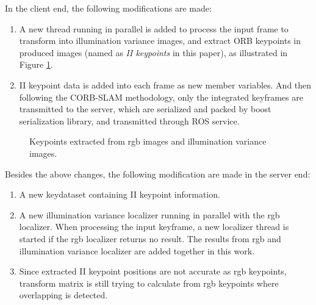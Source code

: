 In the client end, the following modifications are made:

\begin{enumerate}
	\item A new thread running in parallel is added to process the input frame to transform into illumination variance images, and extract ORB keypoints in produced images (named as \textsl{II keypoints} in this paper), as illustrated in Figure \ref{fig:keypoints}.
	\item II keypoint data is added into each frame as new member variables. And then following the CORB-SLAM methodology, only the integrated keyframes are transmitted to the server,  which are serialized and packed by boost serialization library, and transmitted through ROS service.
\end{enumerate}

\begin{figure}
	\centering
	\caption{Keypoints extracted from rgb images and illumination variance images.}
	\label{fig:keypoints}
\end{figure}

Besides the above changes, the following modification are made in the server end:

\begin{enumerate}
	\item A new keydataset containing II keypoint information. 
	\item A new illumination variance localizer running in parallel with the rgb localizer. When processing the input keyframe, a new localizer thread is started if the rgb localizer returns no result. The results from rgb and illumination variance localizer are added together in this work.
	\item Since extracted II keypoint positions are not accurate as rgb keypoints, transform matrix is still trying to calculate from rgb keypoints where overlapping is detected.
\end{enumerate}





\newpage
